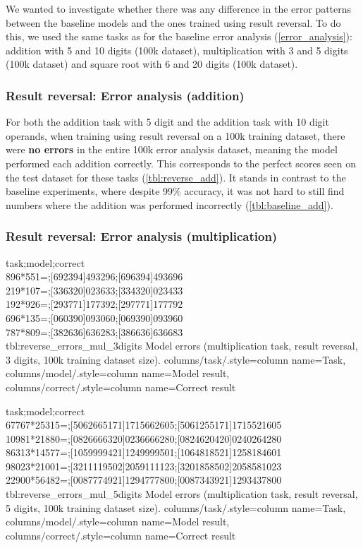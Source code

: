 We wanted to investigate whether there was any difference in the error patterns between the baseline models and the ones trained using result reversal. To do this, we used the same tasks as for the baseline error analysis (\cref{error_analysis}): addition with 5 and 10 digits (100k dataset), multiplication with 3 and 5 digits (100k dataset) and square root with 6 and 20 digits (100k dataset).


\subsubsection{Result reversal: Error analysis (addition)}
\label{resutl_reversal_error_add}

For both the addition task with 5 digit and the addition task with 10 digit operands, when training using result reversal on a 100k training dataset, there were \textbf{no errors} in the entire 100k error analysis dataset, meaning the model performed each addition correctly. This corresponds to the perfect scores seen on the test dataset for these tasks (\cref{tbl:reverse_add}).
It stands in contrast to the baseline experiments, where despite 99\% accuracy, it was not hard to still find numbers where the addition was performed incorrectly (\cref{tbl:baseline_add}).

\subsubsection{Result reversal: Error analysis (multiplication)}

{
task;model;correct\\
896*551=;[692394]493296;[696394]493696\\
219*107=;[336320]023633;[334320]023433\\
192*926=;[293771]177392;[297771]177792\\
696*135=;[060390]093060;[069390]093960\\
787*809=;[382636]636283;[386636]636683\\
}
{tbl:reverse_errors_mul_3digits}
{
    Model errors (multiplication task, result reversal, 3 digits, 100k training dataset size).
}
{
    columns/task/.style={column name={Task}},
    columns/model/.style={column name={Model result}},
    columns/correct/.style={column name={Correct result}}
}

{
task;model;correct\\
67767*25315=;[5062665171]1715662605;[5061255171]1715521605\\
10981*21880=;[0826666320]0236666280;[0824620420]0240264280\\
86313*14577=;[1059999421]1249999501;[1064818521]1258184601\\
98023*21001=;[3211119502]2059111123;[3201858502]2058581023\\
22900*56482=;[0087774921]1294777800;[0087343921]1293437800\\
}
{tbl:reverse_errors_mul_5digits}
{
    Model errors (multiplication task, result reversal, 5 digits, 100k training dataset size).
}
{
    columns/task/.style={column name={Task}},
    columns/model/.style={column name={Model result}},
    columns/correct/.style={column name={Correct result}}
}

